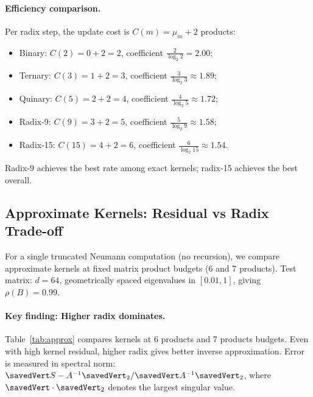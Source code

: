 \documentclass[
  journal=largetwo,
  manuscript=article,
  manuscriptlabel={Research Preprint},
  logo=false,
  simfonts=false,
  year=2026,
  volume=1,
]{cup-journal}
\let\|\savedVert
\theoremstyle{definition}
\theoremstyle{remark}
\begin{document}
\paragraph{Efficiency comparison.}
Per radix step, the update cost is $C(m) = \mu_m + 2$ products:
\begin{itemize}
  \item Binary: $C(2) = 0 + 2 = 2$, coefficient $\frac{2}{\log_2 2} = 2.00$;
  \item Ternary: $C(3) = 1 + 2 = 3$, coefficient $\frac{3}{\log_2 3} \approx 1.89$;
  \item Quinary: $C(5) = 2 + 2 = 4$, coefficient $\frac{4}{\log_2 5} \approx 1.72$;
  \item Radix-9: $C(9) = 3 + 2 = 5$, coefficient $\frac{5}{\log_2 9} \approx 1.58$;
  \item Radix-15: $C(15) = 4 + 2 = 6$, coefficient $\frac{6}{\log_2 15} \approx 1.54$.
\end{itemize}
Radix-9 achieves the best rate among exact kernels; radix-15 achieves the best overall.

\subsection{Approximate Kernels: Residual vs Radix Trade-off}
\label{app:approx}

For a single truncated Neumann computation (no recursion), we compare
approximate kernels at fixed matrix product budgets (6 and 7 products).
Test matrix: $d=64$, geometrically spaced eigenvalues in $[0.01, 1]$,
giving $\rho(B) = 0.99$.

\paragraph{Key finding: Higher radix dominates.}
Table~\ref{tab:approx} compares kernels at 6 products and 7 products budgets.
Even with high kernel residual, higher radix gives better inverse approximation.
Error is measured in spectral norm: $\|S - A^{-1}\|_2 / \|A^{-1}\|_2$,
where $\|\cdot\|_2$ denotes the largest singular value.
\end{document}
